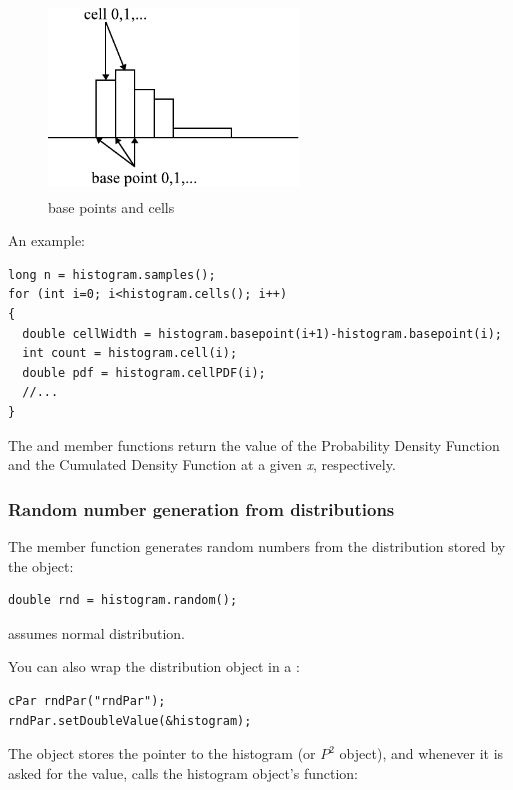 \begin{figure}[htbp]
  \begin{center}
    \includegraphics[width=2.615in, height=2.001in]{figures/usmanFig14}
    \caption{base points and cells}
  \end{center}
\end{figure}

An example:

\begin{verbatim}
long n = histogram.samples();
for (int i=0; i<histogram.cells(); i++)
{
  double cellWidth = histogram.basepoint(i+1)-histogram.basepoint(i);
  int count = histogram.cell(i);
  double pdf = histogram.cellPDF(i);
  //...
}
\end{verbatim}


The  and  member functions
return the value of the Probability Density Function and the Cumulated
Density Function at a given \textit{x}, respectively.


\subsubsection{Random number generation from distributions}


The  member function generates random
numbers from the distribution stored by the
object:

\begin{verbatim}
double rnd = histogram.random();
\end{verbatim}


 assumes normal distribution.

You can also wrap the distribution object in a :

\begin{verbatim}
cPar rndPar("rndPar");
rndPar.setDoubleValue(&histogram);
\end{verbatim}


The  object stores the pointer to the histogram (or $P^{2}$ object),
and whenever it is asked for the value, calls the histogram object's 
function:

